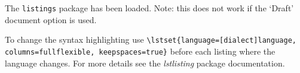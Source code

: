 The \texttt{listings} package has been loaded. Note: this does not work if the `Draft' document option is used.

To change the syntax highlighting use \verb+\lstset{language=[dialect]language, columns=fullflexible, keepspaces=true}+ before each listing where the language changes. For more details see the \emph{lstlisting} package documentation.
